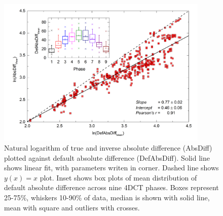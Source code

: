 \documentclass[type=dr, dr=rernat, accentcolor=tud7b,colorbacktitle, bigchapter, openright, twoside, 12pt ]{tudthesis}
\begin{document}
\begin{figure}[H]
	\begin{center}		
		\includegraphics[width=0.9\textwidth]{./Images/absDiff.png}
		\caption{Natural logarithm of true and inverse absolute difference (AbsDiff) plotted against default absolute difference (DefAbsDiff). Solid line shows linear fit, with parameters
		writen in corner. Dashed line shows $y(x)=x$ plot. Inset shows box plots of mean distribution of default absolute difference across nine 4DCT phases. Boxes represent 25-75\%, whiskers 10-90\%
		of data, median is shown with solid line, mean with square and outliers with crosses.}
		\label{absDiff_lung}
	\end{center}
\end{figure}


\newpage
\end{document}

